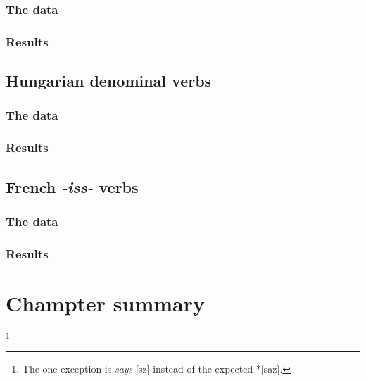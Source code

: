 \subsubsection{The data}

\subsubsection{Results}

\subsection{Hungarian denominal verbs}

\subsubsection{The data}

\subsubsection{Results}

\subsection{French \emph{-iss-} verbs}

\subsubsection{The data}

\subsubsection{Results}

\section{Champter summary}


\footnote{The one exception is \emph{says} [s\textepsilon z] instead of the expected *[sa\textsci z].}


